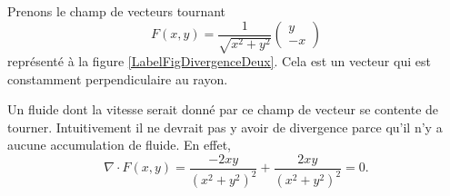 \begin{example}     \label{ExamDivFrot}

    Prenons le champ de vecteurs tournant
    \begin{equation}
        F(x,y)=\frac{1}{ \sqrt{x^2+y^2} }\begin{pmatrix}
            y    \\ 
            -x    
        \end{pmatrix}
    \end{equation}
    représenté à la figure \ref{LabelFigDivergenceDeux}. Cela est un vecteur qui est constamment perpendiculaire au rayon.

    \newcommand{\CaptionFigDivergenceDeux}{Le champ de vecteurs $F(x,y)=(y,-x)$.}
    

    Un fluide dont la vitesse serait donné par ce champ de vecteur se contente de tourner. Intuitivement il ne devrait pas y avoir de divergence parce qu'il n'y a aucune accumulation de fluide. En effet,
    \begin{equation}
        \nabla\cdot F(x,y)=\frac{ -2xy }{ (x^2+y^2)^2 }+\frac{ 2xy }{ (x^2+y^2)^2 }=0.
    \end{equation}
\end{example}

